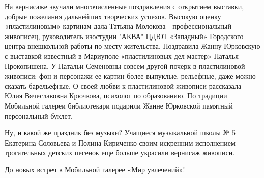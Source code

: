 На вернисаже звучали многочисленные поздравления с открытием выставки, добрые
пожелания дальнейших творческих успехов. Высокую оценку «пластилиновым»
картинам дала Татьяна Молокова - профессиональный живописец, руководитель
изостудии "АКВА" ЦДЮТ «Западный» Городского центра внешкольной работы по месту
жительства.  Поздравила Жанну Юрковскую с выставкой известный в Мариуполе
«пластилиновых дел мастер» Наталья Прокопишена. У Натальи Семеновны совсем
другой почерк в пластилиновой живописи: фон и персонажи ее картин более
выпуклые, рельефные, даже можно сказать барельефные. О своей любви к
пластилиновой живописи рассказала Юлия Вячеславовна Крючкова, психолог по
образованию. По традиции Мобильной галереи библиотекари подарили Жанне
Юрковской памятный персональный буклет.   

Ну, и какой же праздник без музыки? Учащиеся музыкальной школы № 5 Екатерина
Соловьева и Полина Кириченко своим искренним исполнением трогательных детских
песенок еще больше украсили вернисаж живописи.  

До новых встреч в Мобильной галерее «Мир увлечений»!
